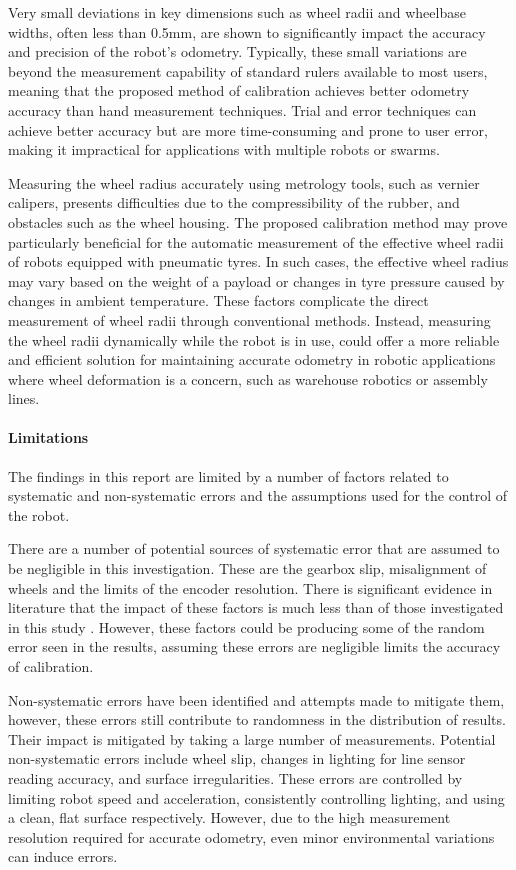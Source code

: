 \documentclass[conference]{IEEEtran}
\begin{document}
Very small deviations in key dimensions such as wheel radii and wheelbase widths, often less than 0.5mm, are shown to significantly impact the accuracy and precision of the robot's odometry. 
Typically, these small variations are beyond the measurement capability of standard rulers available to most users, meaning that the proposed method of calibration achieves better odometry accuracy than hand measurement techniques.
Trial and error techniques can achieve better accuracy but are more time-consuming and prone to user error, making it impractical for applications with multiple robots or swarms.

Measuring the wheel radius accurately using metrology tools, such as vernier calipers, presents difficulties due to the compressibility of the rubber, and obstacles such as the wheel housing. 
The proposed calibration method may prove particularly beneficial for the automatic measurement of the effective wheel radii of robots equipped with pneumatic tyres.
In such cases, the effective wheel radius may vary based on the weight of a payload or changes in tyre pressure caused by changes in ambient temperature. 
These factors complicate the direct measurement of wheel radii through conventional methods.
Instead, measuring the wheel radii dynamically while the robot is in use, could offer a more reliable and efficient solution for maintaining accurate odometry in robotic applications where wheel deformation is a concern, such as warehouse robotics or assembly lines.

\paragraph{Limitations}

The findings in this report are limited by a number of factors related to systematic and non-systematic errors and the assumptions used for the control of the robot. 

There are a number of potential sources of systematic error that are assumed to be negligible in this investigation.
These are the gearbox slip, misalignment of wheels and the limits of the encoder resolution. 
There is significant evidence in literature that the impact of these factors is much less than of those investigated in this study \cite{UMBmark}. 
However, these factors could be producing some of the random error seen in the results, assuming these errors are negligible limits the accuracy of calibration. 

Non-systematic errors have been identified and attempts made to mitigate them, however, these errors still contribute to randomness in the distribution of results. 
Their impact is mitigated by taking a large number of measurements. 
Potential non-systematic errors include wheel slip, changes in lighting for line sensor reading accuracy, and surface irregularities. 
These errors are controlled by limiting robot speed and acceleration, consistently controlling lighting, and using a clean, flat surface respectively. 
However, due to the high measurement resolution required for accurate odometry, even minor environmental variations can induce errors.
\end{document}
